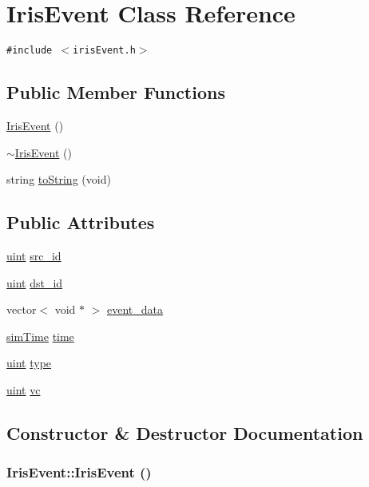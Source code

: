 \hypertarget{classIrisEvent}{
\section{IrisEvent Class Reference}
\label{classIrisEvent}
}
{\tt \#include $<$irisEvent.h$>$}

\subsection*{Public Member Functions}
\begin{CompactItemize}
\item 
\hyperlink{classIrisEvent_231a0a457b0f5469d17804d9ced7cc79}{IrisEvent} ()
\item 
\hyperlink{classIrisEvent_5840e399aa6f659e30dc7757e71dc28b}{$\sim$IrisEvent} ()
\item 
string \hyperlink{classIrisEvent_0af2990076aab1512a61908435010824}{toString} (void)
\end{CompactItemize}
\subsection*{Public Attributes}
\begin{CompactItemize}
\item 
\hyperlink{outputBuffer_8h_91ad9478d81a7aaf2593e8d9c3d06a14}{uint} \hyperlink{classIrisEvent_0ea5ae351f3d7dba0a5ad697a7928754}{src\_\-id}
\item 
\hyperlink{outputBuffer_8h_91ad9478d81a7aaf2593e8d9c3d06a14}{uint} \hyperlink{classIrisEvent_274c046ce64d15b914c0b8cbdebfea31}{dst\_\-id}
\item 
vector$<$ void $\ast$ $>$ \hyperlink{classIrisEvent_26464fd0f931717a1e83b91111efc7b4}{event\_\-data}
\item 
\hyperlink{genericComponentHeader_8h_d88faca783e7aa496cda721d9029a2e3}{simTime} \hyperlink{classIrisEvent_cd8c9add4afdbc69bf7dbcaf8a61ba01}{time}
\item 
\hyperlink{outputBuffer_8h_91ad9478d81a7aaf2593e8d9c3d06a14}{uint} \hyperlink{classIrisEvent_339423ccde297a9d2f4ad3e06fc28030}{type}
\item 
\hyperlink{outputBuffer_8h_91ad9478d81a7aaf2593e8d9c3d06a14}{uint} \hyperlink{classIrisEvent_86ee921447bbc46175221fd912f6e0a7}{vc}
\end{CompactItemize}


\subsection{Constructor \& Destructor Documentation}
\hypertarget{classIrisEvent_231a0a457b0f5469d17804d9ced7cc79}{
\subsubsection[{IrisEvent}]{\setlength{\rightskip}{0pt plus 5cm}IrisEvent::IrisEvent ()}}
\label{classIrisEvent_231a0a457b0f5469d17804d9ced7cc79}


